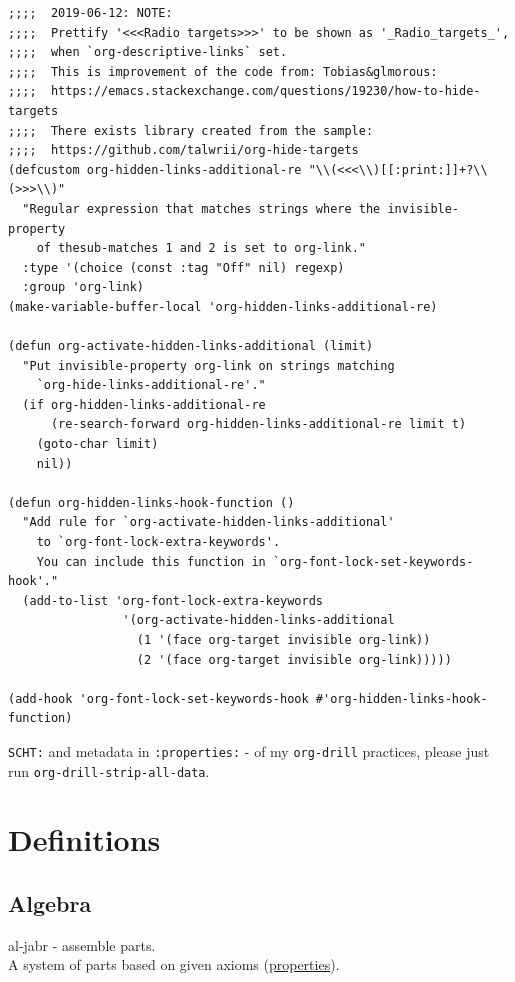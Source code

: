 \documentclass[a4paper,14pt,oneside]{book}
\begin{document}
\begin{verbatim}
;;;;  2019-06-12: NOTE:
;;;;  Prettify '<<<Radio targets>>>' to be shown as '_Radio_targets_',
;;;;  when `org-descriptive-links` set.
;;;;  This is improvement of the code from: Tobias&glmorous:
;;;;  https://emacs.stackexchange.com/questions/19230/how-to-hide-targets
;;;;  There exists library created from the sample:
;;;;  https://github.com/talwrii/org-hide-targets
(defcustom org-hidden-links-additional-re "\\(<<<\\)[[:print:]]+?\\(>>>\\)"
  "Regular expression that matches strings where the invisible-property
    of thesub-matches 1 and 2 is set to org-link."
  :type '(choice (const :tag "Off" nil) regexp)
  :group 'org-link)
(make-variable-buffer-local 'org-hidden-links-additional-re)

(defun org-activate-hidden-links-additional (limit)
  "Put invisible-property org-link on strings matching
    `org-hide-links-additional-re'."
  (if org-hidden-links-additional-re
      (re-search-forward org-hidden-links-additional-re limit t)
    (goto-char limit)
    nil))

(defun org-hidden-links-hook-function ()
  "Add rule for `org-activate-hidden-links-additional'
    to `org-font-lock-extra-keywords'.
    You can include this function in `org-font-lock-set-keywords-hook'."
  (add-to-list 'org-font-lock-extra-keywords
                '(org-activate-hidden-links-additional
                  (1 '(face org-target invisible org-link))
                  (2 '(face org-target invisible org-link)))))

(add-hook 'org-font-lock-set-keywords-hook #'org-hidden-links-hook-function)
\end{verbatim}

\texttt{SCHT:} and metadata in \texttt{:properties:} - of my \texttt{org-drill} practices, please just run \texttt{org-drill-strip-all-data}.\\

\part{Definitions}
\label{sec:org0e8898e}
\chapter{\label{org7212e77}Algebra}
\label{sec:orgb452bb2}
al-jabr - assemble parts.\\
A system of parts based on given axioms (\hyperref[org5d2ad49]{properties}).\\
\end{document}
